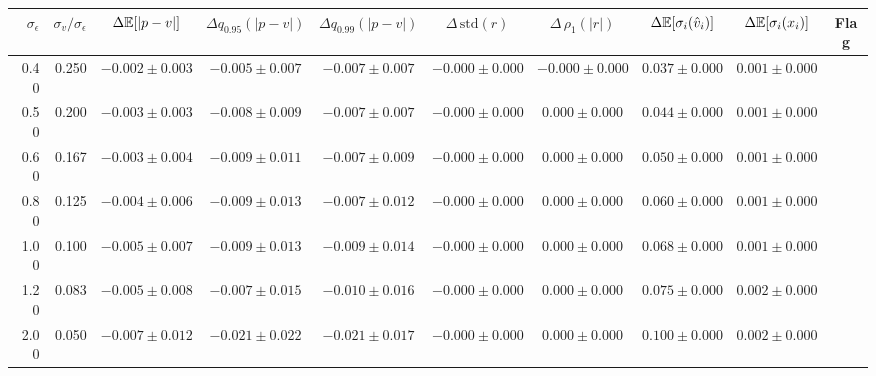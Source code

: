 \begin{tabular}{rrcccccccc}
\hline
$\sigma_\epsilon$ & $\sigma_v/\sigma_\epsilon$ & $\Delta\mathbb{E}[|p-v|]$ & $\Delta q_{0.95}(|p-v|)$ & $\Delta q_{0.99}(|p-v|)$ & $\Delta\,\mathrm{std}(r)$ & $\Delta\,\rho_1(|r|)$ & $\Delta\mathbb{E}[\sigma_i(\hat v_i)]$ & $\Delta\mathbb{E}[\sigma_i(x_i)]$ & Flag \\
\hline
0.40 & 0.250 & $-0.002\pm0.003$ & $-0.005\pm0.007$ & $-0.007\pm0.007$ & $-0.000\pm0.000$ & $-0.000\pm0.000$ & $0.037\pm0.000$ & $0.001\pm0.000$ &  \\
0.50 & 0.200 & $-0.003\pm0.003$ & $-0.008\pm0.009$ & $-0.007\pm0.007$ & $-0.000\pm0.000$ & $0.000\pm0.000$ & $0.044\pm0.000$ & $0.001\pm0.000$ &  \\
0.60 & 0.167 & $-0.003\pm0.004$ & $-0.009\pm0.011$ & $-0.007\pm0.009$ & $-0.000\pm0.000$ & $0.000\pm0.000$ & $0.050\pm0.000$ & $0.001\pm0.000$ &  \\
0.80 & 0.125 & $-0.004\pm0.006$ & $-0.009\pm0.013$ & $-0.007\pm0.012$ & $-0.000\pm0.000$ & $0.000\pm0.000$ & $0.060\pm0.000$ & $0.001\pm0.000$ &  \\
1.00 & 0.100 & $-0.005\pm0.007$ & $-0.009\pm0.013$ & $-0.009\pm0.014$ & $-0.000\pm0.000$ & $0.000\pm0.000$ & $0.068\pm0.000$ & $0.001\pm0.000$ &  \\
1.20 & 0.083 & $-0.005\pm0.008$ & $-0.007\pm0.015$ & $-0.010\pm0.016$ & $-0.000\pm0.000$ & $0.000\pm0.000$ & $0.075\pm0.000$ & $0.002\pm0.000$ &  \\
2.00 & 0.050 & $-0.007\pm0.012$ & $-0.021\pm0.022$ & $-0.021\pm0.017$ & $-0.000\pm0.000$ & $0.000\pm0.000$ & $0.100\pm0.000$ & $0.002\pm0.000$ &  \\
\hline
\end{tabular}
